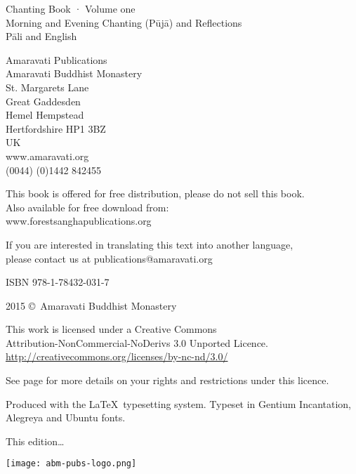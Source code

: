 
\thispagestyle{empty}

{\centering\small
\setlength{\parskip}{15pt}

{\normalsize
Chanting Book · Volume one\\
Morning and Evening Chanting (Pūjā) and Reflections\\
Pāli and English}

Amaravati Publications\\
Amaravati Buddhist Monastery\\
St. Margarets Lane\\
Great Gaddesden\\
Hemel Hempstead\\
Hertfordshire HP1 3BZ\\
UK\\
www.amaravati.org\\
(0044) (0)1442 842455

This book is offered for free distribution, please do not sell this book.\\
Also available for free download from:\\
www.forestsanghapublications.org

If you are interested in translating this text into another language,\\
please contact us at publications@amaravati.org

ISBN 978-1-78432-031-7

2015 \copyright\ Amaravati Buddhist Monastery

\vfill

This work is licensed under a Creative Commons\\
Attribution-NonCommercial-NoDerivs 3.0 Unported Licence.\\
\href{http://creativecommons.org/licenses/by-nc-nd/3.0/}{http://creativecommons.org/licenses/by-nc-nd/3.0/}

See page \pageref{copyright-details} for more details on your rights and restrictions under this licence.

Produced with the \LaTeX\ typesetting system. Typeset in Gentium Incantation,\\
Alegreya and Ubuntu fonts.

This edition\ldots


\texttt{[image: abm-pubs-logo.png]}

}

